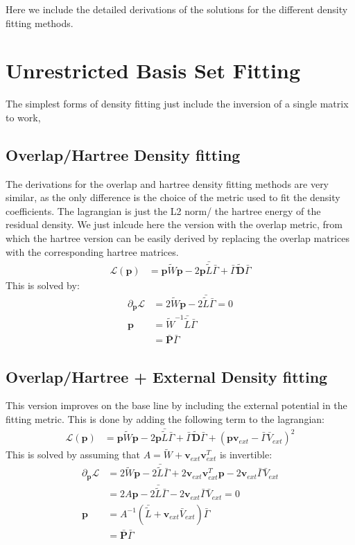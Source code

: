 Here we include the detailed derivations of the solutions for the different density fitting methods.

\section{Unrestricted Basis Set Fitting}
The simplest forms of density fitting just include the inversion of a single matrix to work,
\subsection{Overlap/Hartree Density fitting}
The derivations for the overlap and hartree density fitting methods are very similar, as the only difference is the choice of the metric used to fit the density coefficients.
The lagrangian is just the L2 norm/ the hartree energy of the residual density. We just inlcude here the version with the overlap metric, from which the hartree version can be easily derived by replacing the overlap matrices with the corresponding hartree matrices.
\begin{align}
\mathcal{L}(\mathbf{p}) &= \mathbf{p} \tilde{W} \mathbf{p} - 2 \mathbf{p}\bar {\tilde L} \bar\Gamma + \bar\Gamma \tilde{\mathbf{D}}\bar\Gamma
\end{align}
This is solved by:
\begin{align}
\partial_{\mathbf p}\mathcal L&= 2\tilde{W} \mathbf{p}- 2 \bar {\tilde L} \bar\Gamma=0\\
\mathbf{p}&=\tilde{W}^{-1}\bar {\tilde L} \bar\Gamma\\
&=\bar{\mathbf{P}} \bar\Gamma
\end{align}
\subsection{Overlap/Hartree + External Density fitting}
This version improves on the base line by including the external potential in the fitting metric. This is done by adding the following term to the lagrangian:
\begin{align}
\mathcal{L}(\mathbf{p}) &= \mathbf{p} \tilde{W} \mathbf{p} - 2 \mathbf{p}\bar {\tilde L} \bar\Gamma + \bar\Gamma \tilde{\mathbf{D}}\bar\Gamma + (\mathbf{p}\mathbf{v}_{ext}-\bar\Gamma \bar{V}_{ext})^2
\end{align}
    This is solved by assuming that $A=\tilde{W}+\mathbf{v}_{ext}\mathbf{v}_{ext}^T$ is invertible:
\begin{align}
\partial_{\mathbf p}\mathcal L&= 2\tilde{W} \mathbf{p}- 2 \bar {\tilde L} \bar\Gamma + 2\mathbf{v}_{ext}\mathbf{v}_{ext}^T\mathbf{p} - 2\mathbf{v}_{ext}\bar\Gamma \bar{V}_{ext}\\
&= 2 A \mathbf{p}- 2 \bar {\tilde L} \bar\Gamma - 2\mathbf{v}_{ext}\bar\Gamma \bar{V}_{ext}=0\\
\mathbf{p}&=A^{-1}\left(\bar {\tilde L}+\mathbf{v}_{ext}\bar{V}_{ext}\right) \bar\Gamma\\
&=\bar{\mathbf{P}} \bar\Gamma
\end{align}
